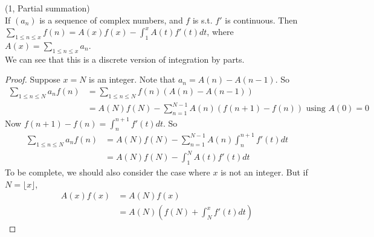 \documentclass[a4paper]{article}
\begin{document}
\begin{lemma} (1, Partial summation)\\
If $(a_n)$ is a sequence of complex numbers, and $f$ is s.t. $f'$ is continuous. Then $\sum_{1 \leq n \leq x} f(n) = A(x) f(x) - \int_1^x A(t) f'(t) dt$, where $A(x) = \sum_{1 \leq n \leq x} a_n$.\\
We can see that this is a discrete version of integration by parts.
\begin{proof}
Suppose $x=N$ is an integer. Note that $a_n = A(n) - A(n-1)$. So
\begin{equation*}
\begin{aligned}
\sum_{1 \leq n \leq N} a_nf(n) &= \sum_{1 \leq n \leq N} f(n) (A(n)-A(n-1))\\
&= A(N)f(N) - \sum_{n=1}^{N-1}A(n) (f(n+1)-f(n)) \text{ using } A(0)=0
\end{aligned}
\end{equation*}
Now $f(n+1)-f(n) = \int_n^{n+1} f'(t)dt$. So
\begin{equation*}
\begin{aligned}
\sum_{1 \leq n \leq N} a_n f(n) &= A(N)f(N) - \sum_{n=1}^{N-1} A(n) \int_n^{n+1} f'(t) dt\\
&= A(N)f(N) - \int_1^N A(t) f'(t) dt
\end{aligned}
\end{equation*}
To be complete, we should also consider the case where $x$ is not an integer. But if $N=\lfloor x \rfloor$,
\begin{equation*}
\begin{aligned}
A(x) f(x) &= A(N)f(x)\\
&=A(N)\left(f(N)+\int_N^x f'(t)dt\right)
\end{aligned}
\end{equation*}
\end{proof}
\end{lemma}
\end{document}
